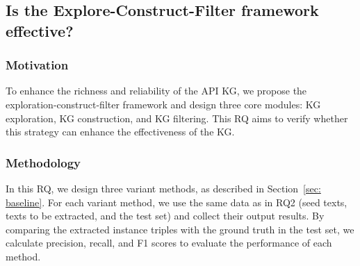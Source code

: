

\subsection{Is the Explore-Construct-Filter framework effective?}\label{sec: RQ3}
\subsubsection{Motivation}
To enhance the richness and reliability of the API KG, we propose the exploration-construct-filter framework and design three core modules: KG exploration, KG construction, and KG filtering. 
This RQ aims to verify whether this strategy can enhance the effectiveness of the KG.

\subsubsection{Methodology}
In this RQ, we design three variant methods, as described in Section~\ref{sec: baseline}.
For each variant method, we use the same data as in RQ2 (seed texts, texts to be extracted, and the test set) and collect their output results.
By comparing the extracted instance triples with the ground truth in the test set, we calculate precision, recall, and F1 scores to evaluate the performance of each method.


